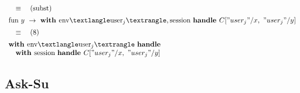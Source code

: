 \documentclass[logo,bsc,singlespacing,parskip]{infthesis}
\begin{document}
\[\begin{array}{l}
\quad\equiv\quad (\text{subst}) \\[5pt]
\text{fun } y\ \rightarrow\ \textbf{with } \text{env}⟨\text{user}_j⟩, \text{session}\ \textbf{handle } C["user_j"/x,\ "user_j"/y] \\[5pt]

\quad\equiv\quad (8) \\[5pt]
\textbf{with } \text{env}⟨\text{user}_j⟩\ \textbf{handle} \\
\quad \textbf{with } \text{session}\ \textbf{handle } C["user_j"/x,\ "user_j"/y] \\
\end{array}
\]

\subsection{Ask-Su}
\end{document}
